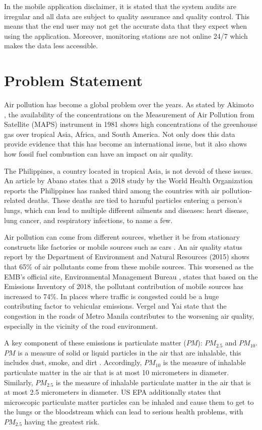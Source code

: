 In the mobile application disclaimer, it is stated that the system audits are irregular and all data are subject to quality assurance and quality control. This means that the end user may not get the accurate data that they expect when using the application. Moreover, monitoring stations are not online 24/7 which makes the data less accessible.


\section{Problem Statement}
	Air pollution has become a global problem over the years. As stated by Akimoto \citeyear{Akimoto2004}, the availability of the  concentrations on the Measurement of Air Pollution from Satellite (MAPS) instrument in 1981 shows high concentrations of the greenhouse gas over tropical Asia, Africa, and South America. Not only does this data provide evidence that this has become an international issue,  but it also shows how fossil fuel combustion can have an impact on air quality. 

The Philippines, a country located in tropical Asia, is not devoid of these issues. An article by Abano \citeyear{abano_2019} states that a 2018 study by the World Health Organization reports the Philippines has ranked third among the countries with air pollution-related deaths. These deaths are tied to harmful particles entering a person’s lungs, which can lead to multiple different ailments and diseases: heart disease, lung cancer, and respiratory infections, to name a few.

Air pollution can come from different sources, whether it be from stationary constructs like factories or mobile sources such as cars \cite{EMB_2015}. An air quality status report by the Department of Environment and Natural Resources (2015) shows that 65\% of air pollutants come from these mobile sources. This worsened as the EMB’s official site, Environmental Management Bureau \citeyear{EMB_2018}, states that based on the Emissions Inventory of 2018, the pollutant contribution of mobile sources has increased to  74\%. In places where traffic is congested could be a huge contributing factor to vehicular emissions. Vergel and Yai \citeyear{vergel_yai2000} state that the congestion in the roads of Metro Manila contributes to the worsening air quality, especially in the vicinity of the road environment.

A key component of these emissions is particulate matter ($PM$): $PM_{2.5}$ and $PM_{10}$. $PM$ is a measure of solid or liquid particles in the air that are inhalable, this includes dust, smoke, and dirt \cite{EPA_2022}. Accordingly, $PM_{10}$ is the measure of inhalable particulate matter in the air that is at most 10 micrometers in diameter. Similarly, $PM_{2.5}$ is the measure of inhalable particulate matter in the air that is at most 2.5 micrometers in diameter. US EPA \citeyear{EPA_2022} additionally states that microscopic particulate matter particles can be inhaled and cause them to get to the lungs or the bloodstream which can lead to serious health problems, with $PM_{2.5}$ having the greatest risk.

